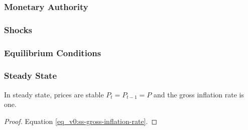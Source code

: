 \documentclass[../thesis.tex]{subfiles}
\begin{document}

\begin{definition}
	\cite[Lecture 1, p.5]{solis-garcia_ucb_2022}
\end{definition}

\begin{definition}
	\cite[Lecture 1, p.5]{solis-garcia_ucb_2022}
\end{definition}

\subsubsection*{Monetary Authority}

\subsubsection*{Shocks}

\subsubsection*{Equilibrium Conditions}

\begin{definition}
	\cite[Lecture 1, p.6]{solis-garcia_ucb_2022}
\end{definition}


\subsubsection*{Steady State}


\begin{lemma}\label{lemma:steady-state-inflation}
	
	In steady state, prices are stable $P_t = P_{t-1} = P$ and the gross inflation rate is one.
	\begin{proof} Equation \ref{eq_v0:ss-gross-inflation-rate}. \end{proof}  \end{lemma}
\end{document}
